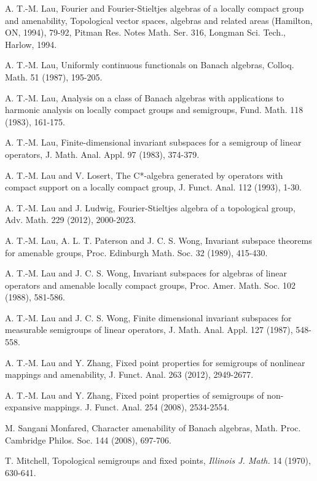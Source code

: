 \documentclass{tran-l}
\numberwithin{equation}{section}
\theoremstyle{definition}
\theoremstyle{remark}
\begin{document}
\begin{thebibliography}{99}
A. T.-M. Lau, Fourier and Fourier-Stieltjes algebras of a locally compact group and amenability, Topological vector spaces, algebras and related areas (Hamilton, ON, 1994), 79-92, Pitman Res. Notes Math. Ser. 316, Longman Sci. Tech., Harlow, 1994.

A. T.-M. Lau, Uniformly continuous functionals on Banach algebras, Colloq. Math. 51 (1987), 195-205.

A. T.-M. Lau, Analysis on a class of Banach algebras with applications to harmonic analysis on locally compact groups and semigroups, Fund. Math. 118 (1983), 161-175.

A. T.-M. Lau, Finite-dimensional invariant subspaces for a semigroup of linear operators, J. Math. Anal. Appl. 97 (1983), 374-379.

A. T.-M. Lau and V. Losert, The C*-algebra generated by operators with compact support on a locally compact group, J. Funct. Anal. 112 (1993), 1-30.

A. T.-M. Lau and J. Ludwig, Fourier-Stieltjes algebra of a topological group, Adv. Math. 229 (2012), 2000-2023. 

A. T.-M. Lau, A. L. T. Paterson and J. C. S. Wong, Invariant subspace theorems for amenable groups, Proc. Edinburgh Math. Soc. 32 (1989), 415-430.

A. T.-M. Lau and J. C. S. Wong, Invariant subspaces for algebras of linear operators and amenable locally compact groups, Proc. Amer. Math. Soc. 102 (1988), 581-586.

A. T.-M. Lau and J. C. S. Wong, Finite dimensional invariant subspaces for measurable semigroups of linear operators, J. Math. Anal. Appl. 127 (1987), 548-558.

A. T.-M. Lau and Y. Zhang, Fixed point properties for semigroups of nonlinear mappings and amenability, J. Funct. Anal. 263 (2012), 2949-2677.

A. T.-M. Lau and Y. Zhang, 
Fixed point properties of semigroups of non-expansive mappings. J. Funct. Anal.  254  (2008), 2534-2554.

M. Sangani Monfared, Character amenability of Banach algebras, Math. Proc. Cambridge Philos. Soc. 144 (2008), 697-706. 

T. Mitchell, Topological semigroups and fixed points, {\it Illinois J. Math.} 14 (1970), 630-641.


\end{thebibliography}
\end{document}
